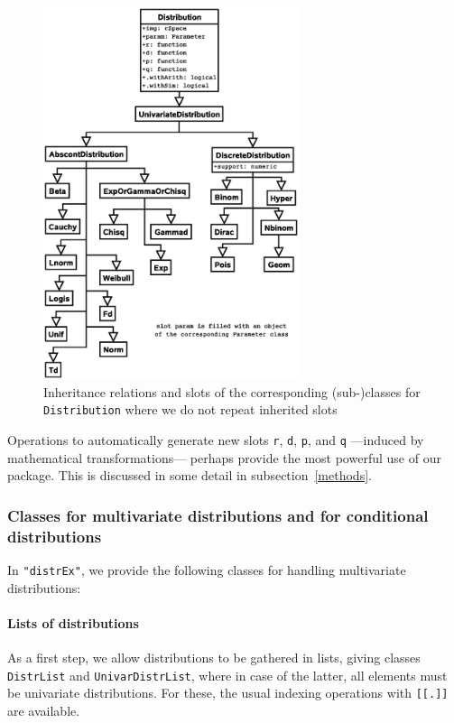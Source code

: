\documentclass[11pt]{article}
\newcommand{\code}[1]{{\tt #1}}
\newcommand{\pkg}[1]{{\tt "#1"}}
\begin{document}
\else
\begin{figure}[htb]\label{fig1}
  \begin{center}
    \includegraphics[viewport=130 150 500 730,width=7.5cm]{distribution.ps}%
    \caption{\label{fig1c}{\footnotesize Inheritance relations and slots of the corresponding \mbox{(sub-)}classes
    for \code{Distribution} where we do not repeat inherited slots
    }}
  \end{center}
\vspace{-1ex}
\end{figure}
\fi
Operations to automatically generate new slots \code{r}, \code{d}, \code{p}, and \code{q} ---induced by
mathematical transformations--- perhaps provide the most powerful use of our package. This is discussed in
some detail in subsection~{\ref{methods}}.
%
\subsubsection{Classes for multivariate distributions and for conditional distributions}

In \pkg{distrEx}, we provide the following classes for handling multivariate distributions:

\paragraph{Lists of distributions}

As a first step, we allow distributions to be gathered in lists, giving
classes \code{DistrList} and \code{UnivarDistrList}, where in case of the latter,
all elements must be univariate distributions. For these, the usual indexing operations
with \code{[[.]]} are available.
\end{document}
